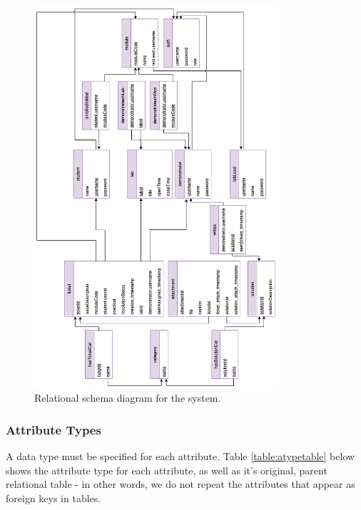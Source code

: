 \begin{figure}[H]
    \centering
    \includegraphics[width=0.8\textwidth]{7design/images/relationalSchema.png}
    \caption{Relational schema diagram for the system.}
    \label{fig:relationalschema}
\end{figure}

\subsubsection{Attribute Types}
A data type must be specified for each attribute. Table \ref{table:atypetable} below shows the attribute type for each attribute, as well as it's original, parent relational table - in other words, we do not repeat the attributes that appear as foreign keys in tables.

